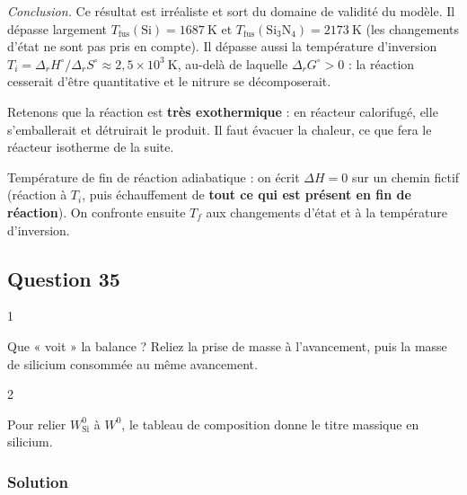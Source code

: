\documentclass[11pt,a4paper]{article}
\newcommand{\equationajustee}[1]{%
  \sbox{\boiteequation}{$\displaystyle #1$}%
  \ifdim\wd\boiteequation>\linewidth
    \[\resizebox{\linewidth}{!}{\usebox{\boiteequation}}\]%
  \else
    \[#1\]%
  \fi}
\begin{document}
\equationajustee{\begin{aligned}
T_f&=298+\frac{828\times10^3}{99{,}5}\\
&\approx\boxed{8{,}6\times10^3\ \mathrm{K}}
\end{aligned}}

\emph{Conclusion.} Ce résultat est irréaliste et sort du domaine de validité du modèle. Il dépasse largement \(T_{\mathrm{fus}}(\mathrm{Si})=1687\ \mathrm{K}\) et \(T_{\mathrm{fus}}(\mathrm{Si_3N_4})=2173\ \mathrm{K}\) (les changements d'état ne sont pas pris en compte). Il dépasse aussi la température d'inversion \(T_i=\Delta_rH^\circ/\Delta_rS^\circ\approx2{,}5\times10^3\ \mathrm{K}\), au-delà de laquelle \(\Delta_rG^\circ>0\) : la réaction cesserait d'être quantitative et le nitrure se décomposerait.

Retenons que la réaction est \textbf{très exothermique} : en réacteur calorifugé, elle s'emballerait et détruirait le produit. Il faut évacuer la chaleur, ce que fera le réacteur isotherme de la suite.

\begin{methode}

Température de fin de réaction adiabatique : on écrit \(\Delta H=0\) sur un chemin fictif (réaction à \(T_i\), puis échauffement de \textbf{tout ce qui est présent en fin de réaction}). On confronte ensuite \(T_f\) aux changements d'état et à la température d'inversion.

\end{methode}

\hypertarget{question-35}{%
\subsection{Question 35}\label{question-35}}

\begin{indication}{1}

Que « voit » la balance ? Reliez la prise de masse à l'avancement, puis la masse de silicium consommée au même avancement.

\end{indication}

\begin{indication}{2}

Pour relier \(W^0_{\mathrm{Si}}\) à \(W^0\), le tableau de composition donne le titre massique en silicium.

\end{indication}

\hypertarget{solution-34}{%
\subsubsection{Solution}\label{solution-34}}
\end{document}
